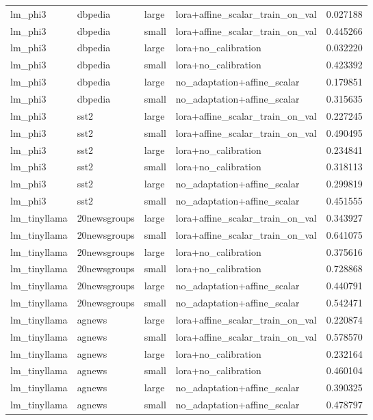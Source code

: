 \begin{tabular}{llllr}
lm_phi3 & dbpedia & large & lora+affine_scalar_train_on_val & 0.027188 \\
lm_phi3 & dbpedia & small & lora+affine_scalar_train_on_val & 0.445266 \\
lm_phi3 & dbpedia & large & lora+no_calibration & 0.032220 \\
lm_phi3 & dbpedia & small & lora+no_calibration & 0.423392 \\
lm_phi3 & dbpedia & large & no_adaptation+affine_scalar & 0.179851 \\
lm_phi3 & dbpedia & small & no_adaptation+affine_scalar & 0.315635 \\
lm_phi3 & sst2 & large & lora+affine_scalar_train_on_val & 0.227245 \\
lm_phi3 & sst2 & small & lora+affine_scalar_train_on_val & 0.490495 \\
lm_phi3 & sst2 & large & lora+no_calibration & 0.234841 \\
lm_phi3 & sst2 & small & lora+no_calibration & 0.318113 \\
lm_phi3 & sst2 & large & no_adaptation+affine_scalar & 0.299819 \\
lm_phi3 & sst2 & small & no_adaptation+affine_scalar & 0.451555 \\
lm_tinyllama & 20newsgroups & large & lora+affine_scalar_train_on_val & 0.343927 \\
lm_tinyllama & 20newsgroups & small & lora+affine_scalar_train_on_val & 0.641075 \\
lm_tinyllama & 20newsgroups & large & lora+no_calibration & 0.375616 \\
lm_tinyllama & 20newsgroups & small & lora+no_calibration & 0.728868 \\
lm_tinyllama & 20newsgroups & large & no_adaptation+affine_scalar & 0.440791 \\
lm_tinyllama & 20newsgroups & small & no_adaptation+affine_scalar & 0.542471 \\
lm_tinyllama & agnews & large & lora+affine_scalar_train_on_val & 0.220874 \\
lm_tinyllama & agnews & small & lora+affine_scalar_train_on_val & 0.578570 \\
lm_tinyllama & agnews & large & lora+no_calibration & 0.232164 \\
lm_tinyllama & agnews & small & lora+no_calibration & 0.460104 \\
lm_tinyllama & agnews & large & no_adaptation+affine_scalar & 0.390325 \\
lm_tinyllama & agnews & small & no_adaptation+affine_scalar & 0.478797 \\

\end{tabular}
